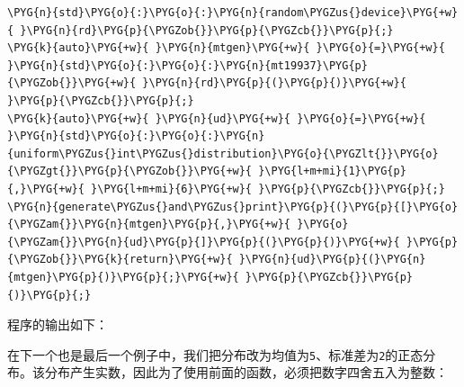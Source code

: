 \begin{codeblockbg}
\begin{Verbatim}[commandchars=\\\{\},breaklines=true,breakanywhere=true,fontsize=\codefont,xleftmargin=17bp]
\PYG{n}{std}\PYG{o}{:}\PYG{o}{:}\PYG{n}{random\PYGZus{}device}\PYG{+w}{ }\PYG{n}{rd}\PYG{p}{\PYGZob{}}\PYG{p}{\PYGZcb{}}\PYG{p}{;}
\PYG{k}{auto}\PYG{+w}{ }\PYG{n}{mtgen}\PYG{+w}{ }\PYG{o}{=}\PYG{+w}{ }\PYG{n}{std}\PYG{o}{:}\PYG{o}{:}\PYG{n}{mt19937}\PYG{p}{\PYGZob{}}\PYG{+w}{ }\PYG{n}{rd}\PYG{p}{(}\PYG{p}{)}\PYG{+w}{ }\PYG{p}{\PYGZcb{}}\PYG{p}{;}
\PYG{k}{auto}\PYG{+w}{ }\PYG{n}{ud}\PYG{+w}{ }\PYG{o}{=}\PYG{+w}{ }\PYG{n}{std}\PYG{o}{:}\PYG{o}{:}\PYG{n}{uniform\PYGZus{}int\PYGZus{}distribution}\PYG{o}{\PYGZlt{}}\PYG{o}{\PYGZgt{}}\PYG{p}{\PYGZob{}}\PYG{+w}{ }\PYG{l+m+mi}{1}\PYG{p}{,}\PYG{+w}{ }\PYG{l+m+mi}{6}\PYG{+w}{ }\PYG{p}{\PYGZcb{}}\PYG{p}{;}
\PYG{n}{generate\PYGZus{}and\PYGZus{}print}\PYG{p}{(}\PYG{p}{[}\PYG{o}{\PYGZam{}}\PYG{n}{mtgen}\PYG{p}{,}\PYG{+w}{ }\PYG{o}{\PYGZam{}}\PYG{n}{ud}\PYG{p}{]}\PYG{p}{(}\PYG{p}{)}\PYG{+w}{ }\PYG{p}{\PYGZob{}}\PYG{k}{return}\PYG{+w}{ }\PYG{n}{ud}\PYG{p}{(}\PYG{n}{mtgen}\PYG{p}{)}\PYG{p}{;}\PYG{+w}{ }\PYG{p}{\PYGZcb{}}\PYG{p}{)}\PYG{p}{;}
\end{Verbatim}
\end{codeblockbg}



程序的输出如下：






在下一个也是最后一个例子中，我们把分布改为均值为\texttt{5}、标准差为\texttt{2}的正态分布。该分布产生实数，因此为了使用前面的函数，必须把数字四舍五入为整数：



